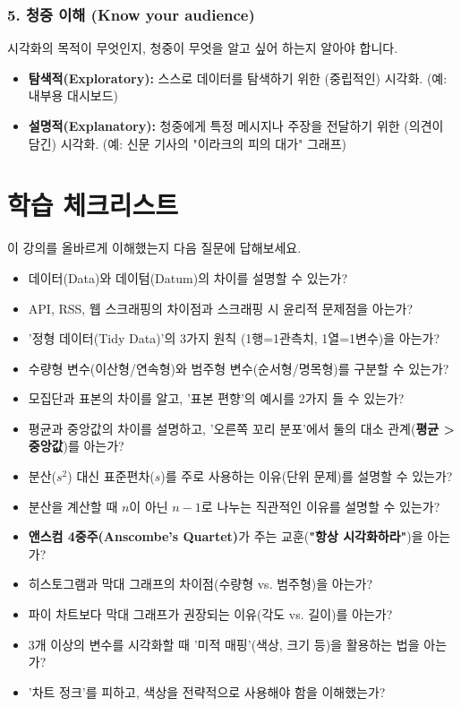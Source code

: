 \documentclass[11pt,a4paper]{book}
\theoremstyle{definition}
\begin{document}
\subsubsection{5. 청중 이해 (Know your audience)}

시각화의 목적이 무엇인지, 청중이 무엇을 알고 싶어 하는지 알아야 합니다.
\begin{itemize}
    \item \textbf{탐색적(Exploratory):} 스스로 데이터를 탐색하기 위한 (중립적인) 시각화. (예: 내부용 대시보드)
    \item \textbf{설명적(Explanatory):} 청중에게 특정 메시지나 주장을 전달하기 위한 (의견이 담긴) 시각화. (예: 신문 기사의 "이라크의 피의 대가" 그래프)
\end{itemize}


\section{학습 체크리스트}

이 강의를 올바르게 이해했는지 다음 질문에 답해보세요.

\begin{itemize}
    \item [ ] 데이터(Data)와 데이텀(Datum)의 차이를 설명할 수 있는가?
    \item [ ] API, RSS, 웹 스크래핑의 차이점과 스크래핑 시 윤리적 문제점을 아는가?
    \item [ ] '정형 데이터(Tidy Data)'의 3가지 원칙 (1행=1관측치, 1열=1변수)을 아는가?
    \item [ ] 수량형 변수(이산형/연속형)와 범주형 변수(순서형/명목형)를 구분할 수 있는가?
    \item [ ] 모집단과 표본의 차이를 알고, '표본 편향'의 예시를 2가지 들 수 있는가?
    \item [ ] 평균과 중앙값의 차이를 설명하고, '오른쪽 꼬리 분포'에서 둘의 대소 관계(\textbf{평균 > 중앙값})를 아는가?
    \item [ ] 분산($s^2$) 대신 표준편차($s$)를 주로 사용하는 이유(단위 문제)를 설명할 수 있는가?
    \item [ ] 분산을 계산할 때 $n$이 아닌 $n-1$로 나누는 직관적인 이유를 설명할 수 있는가?
    \item [ ] \textbf{앤스컴 4중주(Anscombe's Quartet)}가 주는 교훈(\textbf{"항상 시각화하라"})을 아는가?
    \item [ ] 히스토그램과 막대 그래프의 차이점(수량형 vs. 범주형)을 아는가?
    \item [ ] 파이 차트보다 막대 그래프가 권장되는 이유(각도 vs. 길이)를 아는가?
    \item [ ] 3개 이상의 변수를 시각화할 때 '미적 매핑'(색상, 크기 등)을 활용하는 법을 아는가?
    \item [ ] '차트 정크'를 피하고, 색상을 전략적으로 사용해야 함을 이해했는가?
\end{itemize}
\end{document}
